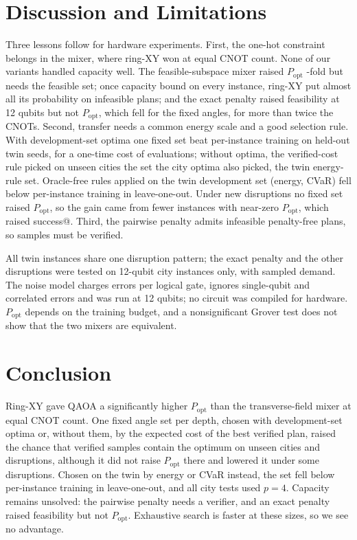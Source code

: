 \documentclass[conference]{IEEEtran}
\begin{document}
\section{Discussion and Limitations}
Three lessons follow for hardware experiments. First, the one-hot constraint belongs in the mixer, where ring-XY won at equal CNOT count. None of our variants handled capacity well. The feasible-subspace mixer raised $P_{\mathrm{opt}}$ \FgOverXYZero-fold but needs the feasible set; once capacity bound on every instance, ring-XY put almost all its probability on infeasible plans; and the exact penalty raised feasibility at 12 qubits but not $P_{\mathrm{opt}}$, which fell for the fixed angles, for more than twice the CNOTs. Second, transfer needs a common energy scale and a good selection rule. With development-set optima one fixed set beat per-instance training on held-out twin seeds, for a one-time cost of \OffTotal{} evaluations; without optima, the verified-cost rule picked on unseen cities the set the city optima also picked, the twin energy-rule set. Oracle-free rules applied on the twin development set (energy, CVaR) fell below per-instance training in leave-one-out. Under new disruptions no fixed set raised $P_{\mathrm{opt}}$, so the gain came from fewer instances with near-zero $P_{\mathrm{opt}}$, which raised success@\Shots. Third, the pairwise penalty admits infeasible penalty-free plans, so samples must be verified.

All twin instances share one disruption pattern; the exact penalty and the other disruptions were tested on 12-qubit city instances only, with sampled demand. The noise model charges errors per logical gate, ignores single-qubit and correlated errors and was run at 12 qubits; no circuit was compiled for hardware. $P_{\mathrm{opt}}$ depends on the training budget, and a nonsignificant Grover test does not show that the two mixers are equivalent.

\section{Conclusion}
Ring-XY gave QAOA a significantly higher $P_{\mathrm{opt}}$ than the transverse-field mixer at equal CNOT count. One fixed angle set per depth, chosen with development-set optima or, without them, by the expected cost of the best verified plan, raised the chance that \Shots{} verified samples contain the optimum on unseen cities and disruptions, although it did not raise $P_{\mathrm{opt}}$ there and lowered it under some disruptions. Chosen on the twin by energy or CVaR instead, the set fell below per-instance training in leave-one-out, and all city tests used $p=4$. Capacity remains unsolved: the pairwise penalty needs a verifier, and an exact penalty raised feasibility but not $P_{\mathrm{opt}}$. Exhaustive search is faster at these sizes, so we see no advantage.
\end{document}
